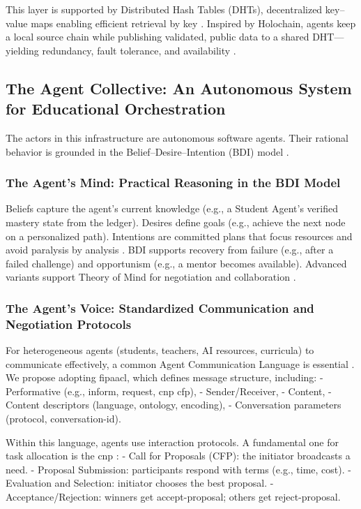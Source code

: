 \documentclass[12pt,a4paper]{article}
\begin{document}
This layer is supported by Distributed Hash Tables (DHTs), decentralized key--value maps enabling efficient retrieval by key \autocite{wiki_dht,dua2025_dht,wiki_dht2}. Inspired by Holochain, agents keep a local source chain while publishing validated, public data to a shared DHT---yielding redundancy, fault tolerance, and availability \autocite{holochain}.

\subsection{The Agent Collective: An Autonomous System for Educational Orchestration}
The actors in this infrastructure are autonomous software agents. Their rational behavior is grounded in the Belief--Desire--Intention (BDI) model \autocite{georgeff1998,wiki_bdi,rao_bdi}.

\subsubsection{The Agent's Mind: Practical Reasoning in the BDI Model}
Beliefs capture the agent’s current knowledge (e.g., a Student Agent’s verified mastery state from the ledger). Desires define goals (e.g., achieve the next node on a personalized path). Intentions are committed plans that focus resources and avoid paralysis by analysis \autocite{georgeff1998}. BDI supports recovery from failure (e.g., after a failed challenge) and opportunism (e.g., a mentor becomes available). Advanced variants support Theory of Mind for negotiation and collaboration \autocite{zhao2025}.

\subsubsection{The Agent's Voice: Standardized Communication and Negotiation Protocols}
For heterogeneous agents (students, teachers, AI resources, curricula) to communicate effectively, a common Agent Communication Language is essential \autocite{dua2025_acl,labrou1999,fipa2002,sarl_github}. We propose adopting \gls{fipaacl}, which defines message structure, including:
- Performative (e.g., inform, request, \gls{cnp} cfp),
- Sender/Receiver,
- Content,
- Content descriptors (language, ontology, encoding),
- Conversation parameters (protocol, conversation-id).

Within this language, agents use interaction protocols. A fundamental one for task allocation is the \gls{cnp} \autocite{wiki_cnp,ohare1998}:
- Call for Proposals (CFP): the initiator broadcasts a need.
- Proposal Submission: participants respond with terms (e.g., time, cost).
- Evaluation and Selection: initiator chooses the best proposal.
- Acceptance/Rejection: winners get accept-proposal; others get reject-proposal.
\end{document}
